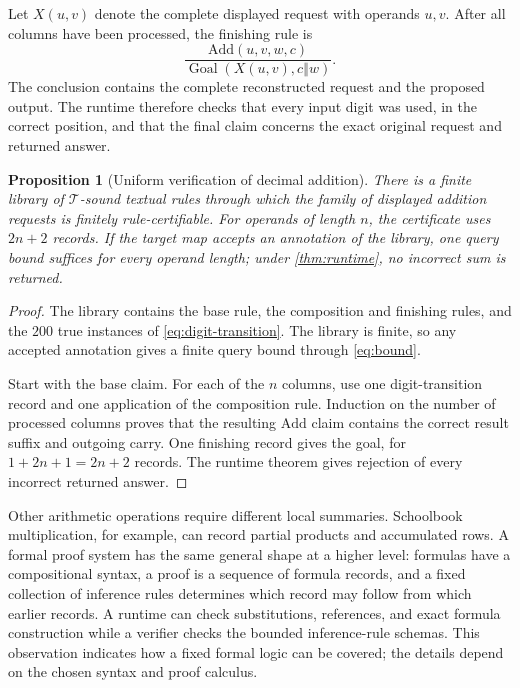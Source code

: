 \documentclass[11pt,twoside]{article}
\newtheorem{proposition}[theorem]{Proposition}
\theoremstyle{definition}
\newcommand{\True}{\mathcal T}
\newcommand{\Goal}{\operatorname{Goal}}
\newcommand{\cat}{\mathbin{\Vert}}
\begin{document}
Let $X(u,v)$ denote the complete displayed request with operands $u,v$. After
all columns have been processed, the finishing rule is
\begin{equation}
 \frac{\mathrm{Add}(u,v,w,c)}{\Goal(X(u,v),c\cat w)}.
\label{eq:add-finish}
\end{equation}
The conclusion contains the complete reconstructed request and the proposed
output. The runtime therefore checks that every input digit was used, in the
correct position, and that the final claim concerns the exact original request
and returned answer.

\begin{proposition}[Uniform verification of decimal addition]
There is a finite library of $\True$-sound textual rules through which the
family of displayed addition requests is finitely rule-certifiable. For
operands of length $n$, the certificate uses $2n+2$ records. If the target map
accepts an annotation of the library, one query bound suffices for every
operand length; under \cref{thm:runtime}, no incorrect sum is returned.
\end{proposition}
\begin{proof}
The library contains the base rule, the composition and finishing rules, and
the $200$ true instances of \cref{eq:digit-transition}. The library is finite,
so any accepted annotation gives a finite query bound through
\cref{eq:bound}.

Start with the base claim. For each of the $n$ columns, use one digit-transition
record and one application of the composition rule. Induction on the number of
processed columns proves that the resulting $\mathrm{Add}$ claim contains the
correct result suffix and outgoing carry. One finishing record gives the goal,
for $1+2n+1=2n+2$ records. The runtime theorem gives rejection of every
incorrect returned answer.
\end{proof}

Other arithmetic operations require different local summaries. Schoolbook
multiplication, for example, can record partial products and accumulated rows.
A formal proof system has the same general shape at a higher level: formulas
have a compositional syntax, a proof is a sequence of formula records, and a
fixed collection of inference rules determines which record may follow from
which earlier records. A runtime can check substitutions, references, and
exact formula construction while a verifier checks the bounded inference-rule
schemas. This observation indicates how a fixed formal logic can be covered;
the details depend on the chosen syntax and proof calculus.
\end{document}
